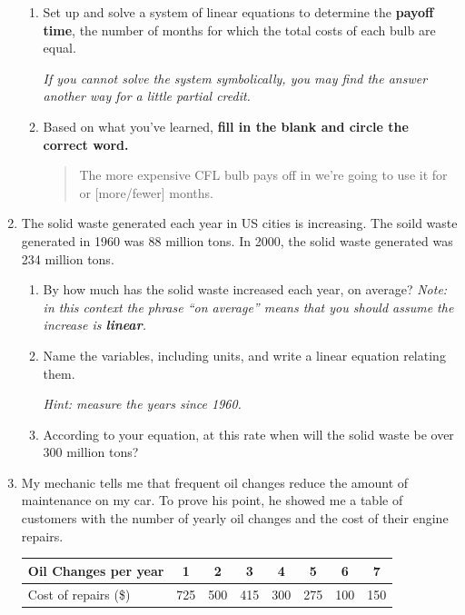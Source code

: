 \documentclass[12pt]{article}
\begin{document}
\begin{enumerate}
\begin{enumerate}
\item Set up and solve a system of linear equations to determine the \textbf{payoff time}, the number of months for which the total costs of each bulb are equal.

\emph{If you cannot solve the system symbolically, you may find the answer another way for a little partial credit.}
\vfill

\item Based on what you've learned, \textbf{fill in the blank and circle the correct word.}

\begin{quote}
The more expensive CFL bulb pays off in we're going to use it for \hrulefill  or [more/fewer] months.  
\end{quote}

\end{enumerate}

\newpage



\item The solid waste generated each year in US cities is increasing.  The soild waste generated in 1960 was 88 million tons. In 2000, the solid waste generated was 234 million tons.  

\begin{enumerate}
\item By how much has the solid waste increased each year, on average?  \emph{Note:  in this context the phrase ``on average'' means that you should assume the increase is \textbf{linear}.}
\vfill
\item Name the variables, including units, and write a linear equation relating them.

\emph{Hint:  measure the years since 1960.}
\vfill
\item According to your equation, at this rate when will the solid waste be over 300 million tons?
\vfill
\end{enumerate}

\newpage %


\item My mechanic tells me that frequent oil changes reduce the amount of maintenance on my car.  To prove his point, he showed me a table of customers with the number of yearly oil changes and the cost of their engine repairs.

\begin{center}
\begin{tabular} {|l|c|c |c|c|c|c|c|}  \hline
Oil Changes per year & 1 & 2 & 3 & 4 & 5 & 6 & 7  \\ \hline
Cost of repairs (\$) & 725 & 500 & 415 & 300 & 275 & 100 & 150  \\ \hline
\end{tabular}
\end{center}


\end{enumerate}
\end{document}
